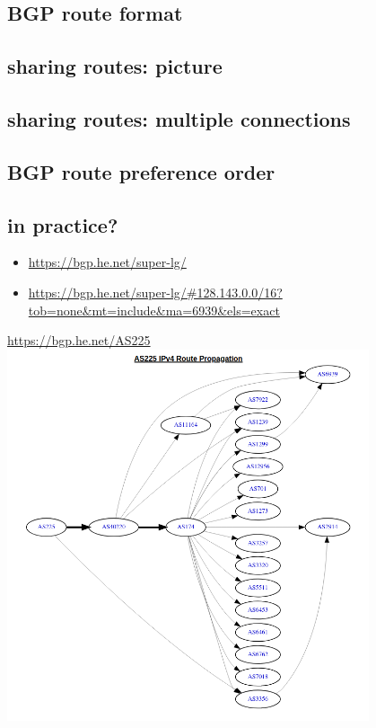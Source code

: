 \subsection{BGP route format}


\subsection{sharing routes: picture}


\subsection{sharing routes: multiple connections}


\subsection{BGP route preference order}

\subsection{in practice?}
\begin{frame}[fragile]{}
    \begin{itemize}
    \item \url{https://bgp.he.net/super-lg/}
    \item \url{https://bgp.he.net/super-lg/#128.143.0.0/16?tob=none&mt=include&ma=6939&els=exact}
    \end{itemize}
\end{frame}

\begin{frame}{}
\url{https://bgp.he.net/AS225}
\includegraphics[width=0.8\textwidth]{../routing/as225-graph}
\end{frame}

